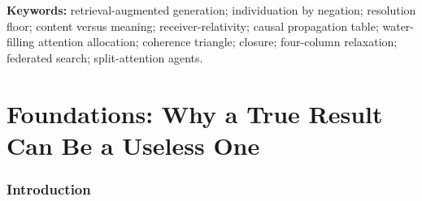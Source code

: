 \documentclass[11pt,twocolumn,a4paper]{article}
\theoremstyle{frathm}
\theoremstyle{definition}
\theoremstyle{remark}
\begin{document}
\begin{abstract}
cycle of \emph{at least three} independently sourced, mutually supporting
retrieval catalysts, never a single passage and never two; and a search
terminates by \textbf{closure}---no further available source can add a new
answer class---never by a confidence threshold crossing, with contested
closure (irreconcilable sources) reported as a first-class output rather
than silently resolved by picking one. Cross-checking answers drawn from
sources with no shared internal representation (a trained domain adapter
against a symbolic index, or two independently fine-tuned models) is
certified by a \textbf{four-column relaxation} to \emph{semantic
quiescence}, which audits the \emph{route}---what each answer would
provoke as a follow-up---rather than the surface content, catching the
false-friend failure in which two sources agree lexically while diverging
in what they individuate. We instantiate the architecture as a concrete
revision of the Four-Sided Triangle pipeline for a bounded research-group
deployment: internal documents, domain-adapted models, and structured
records are federated receivers in one contact graph, queried by
individuation against a specific researcher's own decoder rather than
scored against a receiver-independent notion of relevance. We report a
validation suite of reproducible, seeded computational experiments against
every load-bearing claim, stored as machine-readable JSON records.
\end{abstract}

\noindent\textbf{Keywords:} retrieval-augmented generation; individuation
by negation; resolution floor; content versus meaning; receiver-relativity;
causal propagation table; water-filling attention allocation; coherence
triangle; closure; four-column relaxation; federated search; split-attention
agents.

\tableofcontents

\part{Foundations: Why a True Result Can Be a Useless One}

\section{Introduction}
\label{sec:intro}
\end{document}
